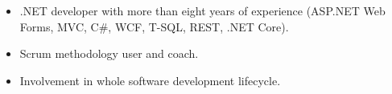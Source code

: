 \begin{itemize}
    \item .NET developer with more than eight years of experience (ASP.NET Web Forms, MVC, C\#, WCF, T-SQL, REST, .NET Core).
    \item Scrum methodology user and coach.
    \item Involvement in whole software development lifecycle.
\end{itemize}